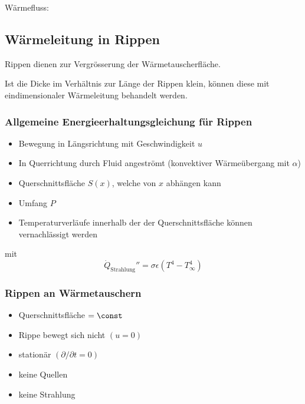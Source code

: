 			Wärmefluss:
	\subsection{Wärmeleitung in Rippen} %
		Rippen dienen zur Vergrösserung der Wärmetauscherfläche.
		
		Ist die Dicke im Verhältnis zur Länge der Rippen klein, können diese mit eindimensionaler Wärmeleitung behandelt werden.
		
		\subsubsection{Allgemeine Energieerhaltungsgleichung für Rippen} %
			\begin{itemize}
				\item Bewegung in Längsrichtung mit Geschwindigkeit $u$
				\item In Querrichtung durch Fluid angeströmt (konvektiver Wärmeübergang mit $\alpha$)
				\item Querschnittsfläche $S(x)$, welche von $x$ abhängen kann
				\item Umfang $P$
				\item Temperaturverläufe innerhalb der der Querschnittsfläche können vernachlässigt werden
			\end{itemize}
			
			mit \[
				\dot Q_\text{Strahlung}'' = \sigma \epsilon (T^4 - T_\infty^4)
			\]
		\subsubsection{Rippen an Wärmetauschern} %
			\begin{itemize}
				\item Querschnittsfläche $= \const$
				\item Rippe bewegt sich nicht $(u = 0)$
				\item stationär $(\partial/\partial t = 0)$
				\item keine Quellen
				\item keine Strahlung
			\end{itemize}
			
